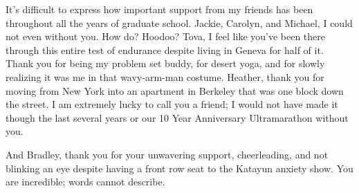 It's difficult to express how important support from my friends has been throughout all the years of graduate school. Jackie, Carolyn, and Michael, I could not even without you. How do? Hoodoo? Tova, I feel like you've been there through this entire test of endurance despite living in Geneva for half of it. Thank you for being my problem set buddy, for desert yoga, and for slowly realizing it was me in that wavy-arm-man costume. Heather, thank you for moving from New York into an apartment in Berkeley that was one block down the street. I am extremely lucky to call you a friend; I would not have made it though the last several years or our 10 Year Anniversary Ultramarathon without you. %

And Bradley, thank you for your unwavering support, cheerleading, and not blinking an eye despite having a front row seat to the Katayun anxiety show. You are incredible; words cannot describe.   %
 
\endgroup
